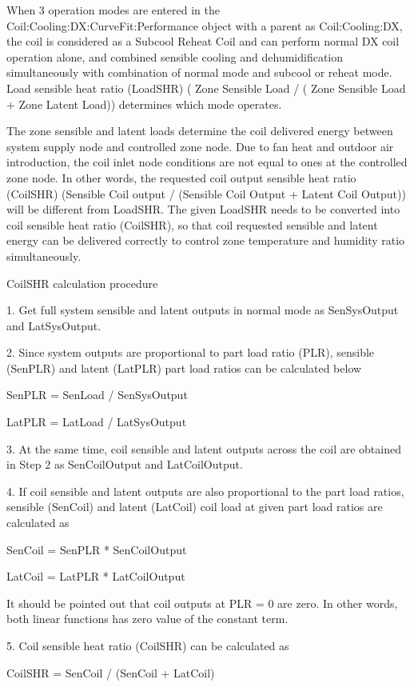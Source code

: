 When 3 operation modes are entered in the Coil:Cooling:DX:CurveFit:Performance object with a parent as Coil:Cooling:DX, the coil is considered as a Subcool Reheat Coil and can perform normal DX coil operation alone, and combined sensible cooling and dehumidification simultaneously with combination of normal mode and subcool or reheat mode. Load sensible heat ratio (LoadSHR) ( Zone Sensible Load / ( Zone Sensible Load + Zone Latent Load)) determines which mode operates.

The zone sensible and latent loads determine the coil delivered energy between system supply node and controlled zone node. Due to fan heat and outdoor air introduction, the coil inlet node conditions are not equal to ones at the controlled zone node. In other words, the requested coil output sensible heat ratio (CoilSHR) (Sensible Coil output / (Sensible Coil Output + Latent Coil Output)) will be different from LoadSHR. The given LoadSHR needs to be converted into coil sensible heat ratio (CoilSHR), so that coil requested sensible and latent energy can be delivered correctly to control zone temperature and humidity ratio simultaneously.

CoilSHR calculation procedure

1. Get full system sensible and latent outputs in normal mode as SenSysOutput and LatSysOutput.

2. Since system outputs are proportional to part load ratio (PLR), sensible (SenPLR) and latent (LatPLR) part load ratios can be calculated below

	SenPLR = SenLoad / SenSysOutput

	LatPLR = LatLoad / LatSysOutput

3. At the same time, coil sensible and latent outputs across the coil are obtained in Step 2 as SenCoilOutput and LatCoilOutput.

4. If coil sensible and latent outputs are also proportional to the part load ratios, sensible (SenCoil) and latent (LatCoil) coil load at given part load ratios are calculated as

	SenCoil = SenPLR * SenCoilOutput

	LatCoil = LatPLR * LatCoilOutput

It should be pointed out that coil outputs at PLR = 0 are zero.  In other words, both linear functions has zero value of the constant term.

5. Coil sensible heat ratio (CoilSHR) can be calculated as

	CoilSHR = SenCoil / (SenCoil + LatCoil)

